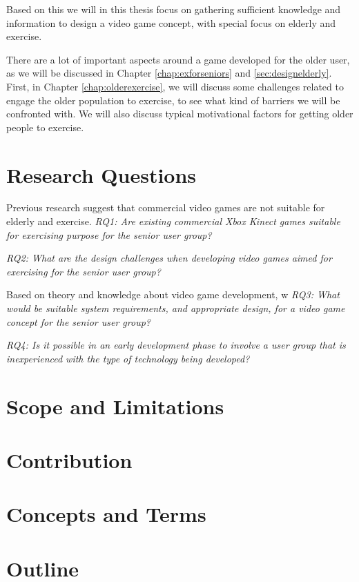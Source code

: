 Based on this we will in this thesis focus on gathering sufficient knowledge and information to design a video game concept, with special focus on elderly and exercise.    

There are a lot of important aspects around a game developed for the older user, as we will be discussed in Chapter \ref{chap:exforseniors} and \ref{sec:designelderly}. First, in Chapter \ref{chap:olderexercise}, we will discuss some challenges related to engage the older population to exercise, to see what kind of barriers we will be confronted with. We will also discuss typical motivational factors for getting older people to exercise.  

\section{Research Questions}
\label{sec:researchq}

Previous research suggest that commercial video games are not suitable for elderly and exercise. 
\emph{RQ1: Are existing commercial Xbox Kinect games suitable for exercising purpose for the senior user group?} 

\emph{RQ2: What are the design challenges when developing video games aimed for exercising for the senior user group?} 

Based on theory and knowledge about video game development, w
\emph{RQ3: What would be suitable system requirements, and appropriate design, for a video game concept for the senior user group?}

\emph{RQ4: Is it possible in an early development phase to involve a user group that is inexperienced with the type of technology being developed?}


\section{Scope and Limitations}

\section{Contribution}

\section{Concepts and Terms}

\section{Outline}